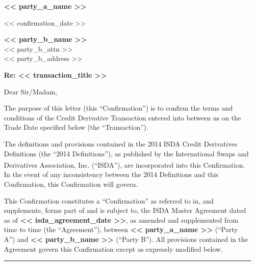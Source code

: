 \documentclass[11pt, a4paper]{article}
\begin{document}

\begin{center}
    \textbf{<< party_a_name >>}
\end{center}
\vspace{0.3cm}

\begin{flushright}
    << confirmation_date >>
\end{flushright}

\vspace{0.3cm}
\noindent \textbf{<< party_b_name >>} \\
\noindent << party_b_attn >> \\
\noindent << party_b_address >>

\vspace{0.5cm}
\noindent \textbf{Re: << transaction_title >>}

\vspace{0.3cm}
\noindent Dear Sir/Madam,

\vspace{0.3cm}
\noindent The purpose of this letter (this ``Confirmation'') is to confirm the terms and conditions of the Credit Derivative Transaction entered into between us on the Trade Date specified below (the ``Transaction'').

\vspace{0.3cm}
\noindent The definitions and provisions contained in the 2014 ISDA Credit Derivatives Definitions (the ``2014 Definitions''), as published by the International Swaps and Derivatives Association, Inc. (``ISDA\textsuperscript{\textregistered}''), are incorporated into this Confirmation. In the event of any inconsistency between the 2014 Definitions and this Confirmation, this Confirmation will govern.

\vspace{0.3cm}
\noindent This Confirmation constitutes a ``Confirmation'' as referred to in, and supplements, forms part of and is subject to, the ISDA Master Agreement dated as of \textbf{<< isda_agreement_date >>}, as amended and supplemented from time to time (the ``Agreement''), between \textbf{<< party_a_name >>} (``Party A'') and \textbf{<< party_b_name >>} (``Party B''). All provisions contained in the Agreement govern this Confirmation except as expressly modified below.

\vspace{0.5cm}
\hrule
\vspace{0.5cm}
\end{document}
